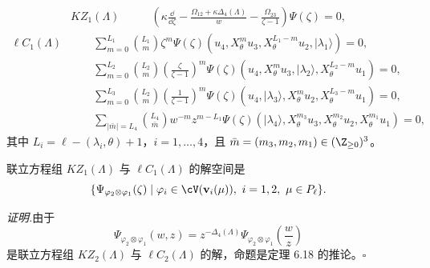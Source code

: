 \[
\begin{aligned}
KZ_1(\Lambda)\qquad
&\left(\kappa\frac{\dd}{\dd\zeta}
-\frac{\Omega_{12}+\kappa\Delta_4(\Lambda)}{w}
-\frac{\Omega_{23}}{\zeta-1}\right)\Psi(\zeta)=0,
\end{aligned}
\]
\[
\begin{aligned}
\ell C_1(\Lambda)\qquad
&\sum_{m=0}^{L_1}\binom{L_1}{m}\zeta^m
 \Psi(\zeta)(u_4,X_\theta^m u_3,X_\theta^{L_1-m}u_2,|\lambda_1\rangle)=0,\\
&\sum_{m=0}^{L_2}\binom{L_2}{m}\left(\frac{\zeta}{\zeta-1}\right)^m
 \Psi(\zeta)(u_4,X_\theta^m u_3,|\lambda_2\rangle,
 X_\theta^{L_2-m}u_1)=0,\\
&\sum_{m=0}^{L_3}\binom{L_2}{m}\left(\frac{1}{\zeta-1}\right)^m
 \Psi(\zeta)(u_4,|\lambda_3\rangle,X_\theta^m u_2,
 X_\theta^{L_3-m}u_1)=0,\\
&\sum_{|\bar{m}|=L_4}\binom{L_4}{\bar{m}}w^{-m}z^{m-L_1}
 \Psi(\zeta)(|\lambda_4\rangle,X_\theta^{m_3}u_3,
 X_\theta^{m_2}u_2,X_\theta^{m_1}u_1)=0,
\end{aligned}
\]
其中 $L_i=\ell-(\lambda_i,\theta)+1$，$i=1,\dots,4$，且
$\bar{m}=(m_3,m_2,m_1)\in(\Z_{\ge0})^3$。

\begin{proposition}[6.19]
联立方程组 $KZ_1(\Lambda)$ 与 $\ell C_1(\Lambda)$ 的解空间是
\[
\{\Psi_{\varphi_2\otimes\varphi_1}(\zeta)\mid
\varphi_i\in\cV(\mathbf{v}_i(\mu)),\ i=1,2,\ \mu\in P_\ell\}.
\]
\end{proposition}

\noindent\textit{证明.}\quad 由于
\[
\Psi_{\varphi_2\otimes\varphi_1}(w,z)
=z^{-\Delta_4(\Lambda)}\Psi_{\varphi_2\otimes\varphi_1}
\left(\frac{w}{z}\right)
\]
是联立方程组 $KZ_2(\Lambda)$ 与 $\ell C_2(\Lambda)$ 的解，命题是定理 6.18
的推论。\hfill$\square$


